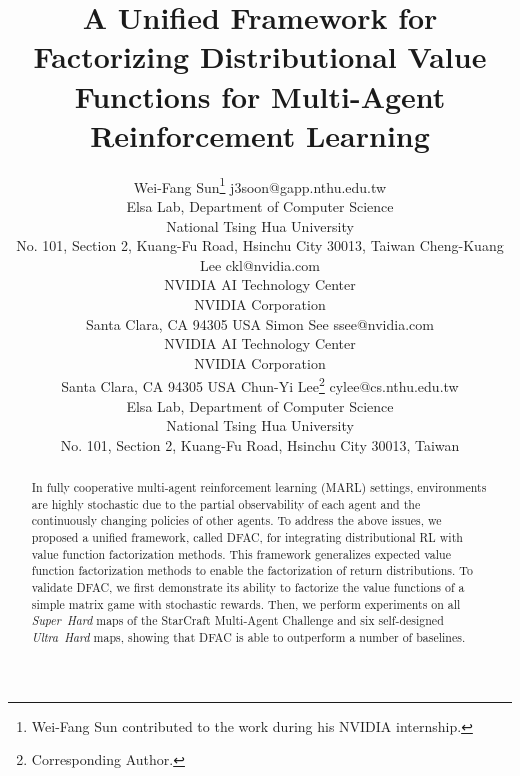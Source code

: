 \documentclass[twoside,11pt]{article}
\newcommand{\superhard}{\textit{Super~Hard}}
\newcommand{\ultrahard}{\textit{Ultra~Hard}}
\begin{document}
\title{A Unified Framework for Factorizing Distributional Value Functions for Multi-Agent Reinforcement Learning}

\author{\name Wei-Fang Sun\thanks{Wei-Fang Sun contributed to the work during his NVIDIA internship.} \email j3soon@gapp.nthu.edu.tw \\
       \addr Elsa Lab, Department of Computer Science\\
       National Tsing Hua University\\
       No. 101, Section 2, Kuang-Fu Road, Hsinchu City 30013, Taiwan
       \AND
       \name Cheng-Kuang Lee \email ckl@nvidia.com \\
       \addr NVIDIA AI Technology Center\\
       NVIDIA Corporation\\
       Santa Clara, CA 94305 USA
       \AND
       \name Simon See \email ssee@nvidia.com \\
       \addr NVIDIA AI Technology Center\\
       NVIDIA Corporation\\
       Santa Clara, CA 94305 USA
       \AND
       \name Chun-Yi Lee\thanks{Corresponding Author.} \email cylee@cs.nthu.edu.tw \\
       \addr Elsa Lab, Department of Computer Science\\
       National Tsing Hua University\\
       No. 101, Section 2, Kuang-Fu Road, Hsinchu City 30013, Taiwan
}


\maketitle

\begin{abstract}
In fully cooperative multi-agent reinforcement learning (MARL) settings, environments are highly stochastic due to the partial observability of each agent and the continuously changing policies of other agents. 
To address the above issues, we proposed a unified framework, called DFAC, for integrating distributional RL with value function factorization methods. This framework generalizes expected value function factorization methods to enable the factorization of return distributions. To validate DFAC, we first demonstrate its ability to factorize the value functions of a simple matrix game with stochastic rewards. Then, we perform experiments on all \superhard{} maps of the StarCraft Multi-Agent Challenge and six self-designed \ultrahard{} maps, showing that DFAC is able to outperform a number of baselines.
\end{abstract}
 
\end{document}
